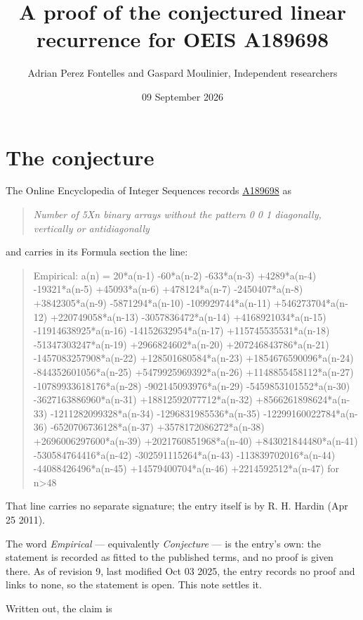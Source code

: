 \documentclass[11pt]{article}
\title{A proof of the conjectured linear recurrence for OEIS A189698}
\author{Adrian Perez Fontelles and Gaspard Moulinier, Independent researchers}
\date{09 September 2026}
\theoremstyle{definition}
\begin{document}
\maketitle
\section{The conjecture}

The Online Encyclopedia of Integer Sequences records \href{https://oeis.org/A189698}{A189698} as

\begin{quote}\itshape Number of 5Xn binary arrays without the pattern 0 0 1 diagonally, vertically or antidiagonally\end{quote}

and carries in its Formula section the line:

\begin{quote}\ttfamily Empirical: a(n) = 20*a(n-1) -60*a(n-2) -633*a(n-3) +4289*a(n-4) -19321*a(n-5) +45093*a(n-6) +478124*a(n-7) -2450407*a(n-8) +3842305*a(n-9) -5871294*a(n-10) -109929744*a(n-11) +546273704*a(n-12) +220749058*a(n-13) -3057836472*a(n-14) +4168921034*a(n-15) -11914638925*a(n-16) -14152632954*a(n-17) +115745535531*a(n-18) -51347303247*a(n-19) +2966824602*a(n-20) +207246843786*a(n-21) -1457083257908*a(n-22) +128501680584*a(n-23) +1854676590096*a(n-24) -844352601056*a(n-25) +5479925969392*a(n-26) +1148855458112*a(n-27) -10789933618176*a(n-28) -902145093976*a(n-29) -5459853101552*a(n-30) -3627163886960*a(n-31) +18812592077712*a(n-32) +8566261898624*a(n-33) -1211282099328*a(n-34) -1296831985536*a(n-35) -12299160022784*a(n-36) -6520706736128*a(n-37) +3578172086272*a(n-38) +2696006297600*a(n-39) +2021760851968*a(n-40) +843021844480*a(n-41) -530584764416*a(n-42) -302591115264*a(n-43) -113839702016*a(n-44) -44088426496*a(n-45) +14579400704*a(n-46) +2214592512*a(n-47) for n>48\end{quote}

That line carries no separate signature; the entry itself is by R. H. Hardin (Apr 25 2011).

The word {\itshape Empirical} --- equivalently {\itshape Conjecture} --- is the entry's own: the statement is recorded as fitted to the published terms, and no proof is given there. As of revision 9, last modified Oct 03 2025, the entry records no proof and links to none, so the statement is open. This note settles it.

Written out, the claim is
\end{document}
